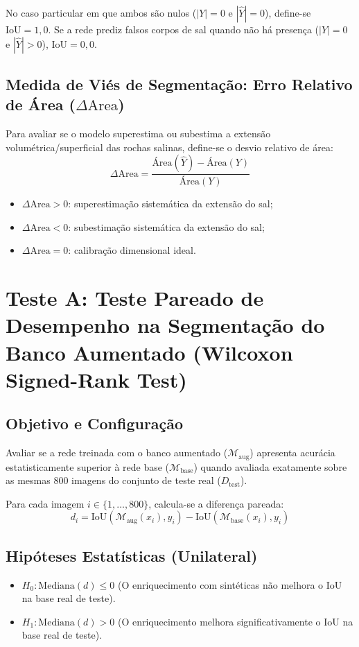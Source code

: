 \documentclass[11pt,a4paper]{article}
\begin{document}
No caso particular em que ambos são nulos ($|Y| = 0$ e $|\hat{Y}| = 0$), define-se $\text{IoU} = 1{,}0$. Se a rede prediz falsos corpos de sal quando não há presença ($|Y|=0$ e $|\hat{Y}|>0$), $\text{IoU} = 0{,}0$.

\subsection{Medida de Viés de Segmentação: Erro Relativo de Área ($\Delta\text{Area}$)}
Para avaliar se o modelo superestima ou subestima a extensão volumétrica/superficial das rochas salinas, define-se o desvio relativo de área:
\begin{equation}
\Delta\text{Area} = \frac{\text{Área}(\hat{Y}) - \text{Área}(Y)}{\text{Área}(Y)}
\end{equation}
\begin{itemize}
    \item $\Delta\text{Area} > 0$: superestimação sistemática da extensão do sal;
    \item $\Delta\text{Area} < 0$: subestimação sistemática da extensão do sal;
    \item $\Delta\text{Area} = 0$: calibração dimensional ideal.
\end{itemize}

\section{Teste A: Teste Pareado de Desempenho na Segmentação do Banco Aumentado (Wilcoxon Signed-Rank Test)}

\subsection{Objetivo e Configuração}
Avaliar se a rede treinada com o banco aumentado ($\mathcal{M}_{\text{aug}}$) apresenta acurácia estatisticamente superior à rede base ($\mathcal{M}_{\text{base}}$) quando avaliada exatamente sobre as mesmas $800$ imagens do conjunto de teste real ($D_{\text{test}}$).

Para cada imagem $i \in \{1, \dots, 800\}$, calcula-se a diferença pareada:
\begin{equation}
d_i = \text{IoU}(\mathcal{M}_{\text{aug}}(x_i), y_i) - \text{IoU}(\mathcal{M}_{\text{base}}(x_i), y_i)
\end{equation}

\subsection{Hipóteses Estatísticas (Unilateral)}
\begin{itemize}
    \item $H_0: \text{Mediana}(d) \le 0$ (O enriquecimento com sintéticas não melhora o IoU na base real de teste).
    \item $H_1: \text{Mediana}(d) > 0$ (O enriquecimento melhora significativamente o IoU na base real de teste).
\end{itemize}
\end{document}
